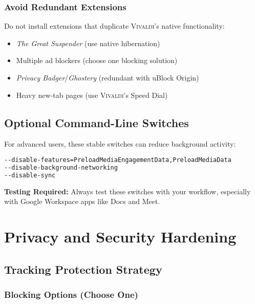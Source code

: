 \documentclass[11pt,a4paper,oneside]{book}
\newcommand{\vivaldi}{\textsc{Vivaldi}}
\newcommand{\extension}[1]{\textit{\color{primaryblue}#1}}
\begin{document}
\subsection{Avoid Redundant Extensions}

Do not install extensions that duplicate \vivaldi{}'s native functionality:

\begin{itemize}
    \item \extension{The Great Suspender} (use native hibernation)
    \item Multiple ad blockers (choose one blocking solution)
    \item \extension{Privacy Badger}/\extension{Ghostery} (redundant with uBlock Origin)
    \item Heavy new-tab pages (use \vivaldi{}'s Speed Dial)
\end{itemize}

\section{Optional Command-Line Switches}

For advanced users, these stable switches can reduce background activity:

\begin{codebox}
\begin{lstlisting}[language=bash]
--disable-features=PreloadMediaEngagementData,PreloadMediaData
--disable-background-networking
--disable-sync
\end{lstlisting}
\end{codebox}

\begin{warningbox}
\textbf{Testing Required:} Always test these switches with your workflow, especially with Google Workspace apps like Docs and Meet.
\end{warningbox}

\chapter{Privacy and Security Hardening}

\section{Tracking Protection Strategy}

\subsection{Blocking Options (Choose One)}
\end{document}
